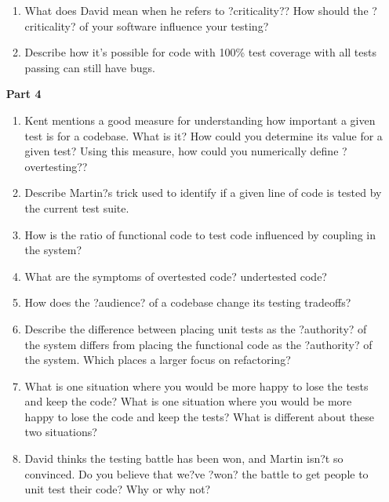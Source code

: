 \begin{enumerate}
\begin{enumerate}

			\item What does David mean when he refers to ?criticality?? How should the ?criticality? of your software influence your testing?


			\item Describe how it's possible for code with 100\% test coverage with all tests passing can still have bugs.


		\end{enumerate}
		
	\item[\bf{Part 4}]
		
		\begin{enumerate}
			\item Kent mentions a good measure for understanding how important a given test is for a codebase. What is it? How could you determine its value for a given test? Using this measure, how could you numerically define ?overtesting??


			\item Describe Martin?s trick used to identify if a given line of code is tested by the current test suite.


			\item How is the ratio of functional code to test code influenced by coupling in the system?


			\item What are the symptoms of overtested code? undertested code?


			\item How does the ?audience? of a codebase change its testing tradeoffs?


			\item Describe the difference between placing unit tests as the ?authority? of the system differs from placing the functional code as the ?authority? of the system. Which places a larger focus on refactoring?


			\item What is one situation where you would be more happy to lose the tests and keep the code? What is one situation where you would be more happy to lose the code and keep the tests? What is different about these two situations?


			\item David thinks the testing battle has been won, and Martin isn?t so convinced. Do you believe that we?ve ?won? the battle to get people to unit test their code? Why or why not?


		\end{enumerate}

\end{enumerate}



